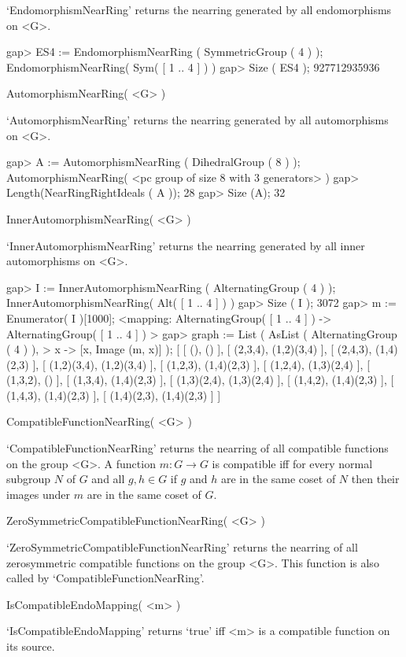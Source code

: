 `EndomorphismNearRing' returns the nearring generated by all endomorphisms
on <G>.

\beginexample
    gap> ES4 := EndomorphismNearRing ( SymmetricGroup ( 4 ) );
    EndomorphismNearRing( Sym( [ 1 .. 4 ] ) )
    gap> Size ( ES4 );
    927712935936
\endexample

\>AutomorphismNearRing( <G> )

`AutomorphismNearRing' returns the nearring generated by all automorphisms
on <G>.

\beginexample
    gap> A := AutomorphismNearRing ( DihedralGroup ( 8 ) );
    AutomorphismNearRing( <pc group of size 8 with 3 generators> )
    gap> Length(NearRingRightIdeals ( A ));
    28
    gap> Size (A);
    32
\endexample

\>InnerAutomorphismNearRing( <G> )

`InnerAutomorphismNearRing' returns the nearring generated by all inner
automorphisms on <G>.

\beginexample
    gap> I := InnerAutomorphismNearRing ( AlternatingGroup ( 4 ) );
    InnerAutomorphismNearRing( Alt( [ 1 .. 4 ] ) )
    gap> Size ( I );
    3072
    gap> m := Enumerator( I )[1000];
    <mapping: AlternatingGroup( [ 1 .. 4 ] ) -> AlternatingGroup( 
    [ 1 .. 4 ] ) >
    gap> graph := List ( AsList ( AlternatingGroup ( 4 ) ),
    > x -> [x, Image (m, x)] );
    [ [ (), () ], [ (2,3,4), (1,2)(3,4) ], [ (2,4,3), (1,4)(2,3) ], 
      [ (1,2)(3,4), (1,2)(3,4) ], [ (1,2,3), (1,4)(2,3) ], 
      [ (1,2,4), (1,3)(2,4) ], [ (1,3,2), () ], [ (1,3,4), (1,4)(2,3) ],
      [ (1,3)(2,4), (1,3)(2,4) ], [ (1,4,2), (1,4)(2,3) ], 
      [ (1,4,3), (1,4)(2,3) ], [ (1,4)(2,3), (1,4)(2,3) ] ]
\endexample

\>CompatibleFunctionNearRing( <G> )

`CompatibleFunctionNearRing' returns the nearring of all compatible functions
on the group <G>. A function $m:G \rightarrow G$ is compatible iff for every normal
subgroup $N$ of $G$ and all $g,h \in G$ if $g$ and $h$ are in the same coset of $N$
then their images under $m$ are in the same coset of $G$.

\>ZeroSymmetricCompatibleFunctionNearRing( <G> )

`ZeroSymmetricCompatibleFunctionNearRing' returns the nearring of all zerosymmetric
compatible functions on the group <G>. This function is also called by 
`CompatibleFunctionNearRing'.

\>IsCompatibleEndoMapping( <m> )

`IsCompatibleEndoMapping' returns `true' iff <m> is a compatible function on its 
source.


